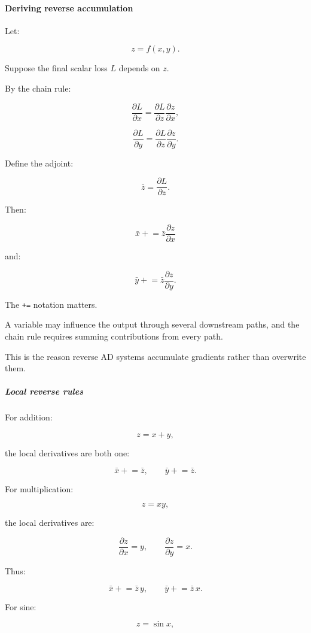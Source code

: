 \paragraph{Deriving reverse accumulation}\label{deriving-reverse-accumulation}

Let:

\[
z=f(x,y).
\]

Suppose the final scalar loss \(L\) depends on \(z\).

By the chain rule:

\[
\frac{\partial L}{\partial x} = \frac{\partial L}{\partial z} \frac{\partial z}{\partial x},
\]

\[
\frac{\partial L}{\partial y} = \frac{\partial L}{\partial z} \frac{\partial z}{\partial y}.
\]

Define the adjoint:

\[
\bar z=\frac{\partial L}{\partial z}.
\]

Then:

\[
\boxed{ \bar x\mathrel{+}= \bar z\frac{\partial z}{\partial x} }
\]

and:

\[
\boxed{ \bar y\mathrel{+}= \bar z\frac{\partial z}{\partial y} }.
\]

The \texttt{+=} notation matters.

A variable may influence the output through several downstream paths, and the chain rule requires summing contributions from every path.

This is the reason reverse AD systems accumulate gradients rather than overwrite them.

\subparagraph{Local reverse rules}\label{local-reverse-rules}

For addition:

\[
z=x+y,
\]

the local derivatives are both one:

\[
\bar x\mathrel{+}=\bar z, \qquad \bar y\mathrel{+}=\bar z.
\]

For multiplication:

\[
z=xy,
\]

the local derivatives are:

\[
\frac{\partial z}{\partial x}=y, \qquad \frac{\partial z}{\partial y}=x.
\]

Thus:

\[
\boxed{ \bar x\mathrel{+}=\bar z\,y, \qquad \bar y\mathrel{+}=\bar z\,x }.
\]

For sine:

\[
z=\sin x,
\]

